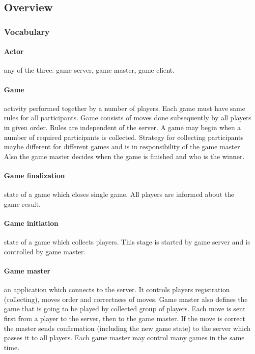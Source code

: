 \documentclass{article}
\begin{document}
\pagebreak[4]


\subsection{Overview}
\subsubsection{Vocabulary}

\paragraph{Actor}
any of the three: game server, game master, game client.

\paragraph{Game}
activity performed together by a number of players. Each game must have same rules for all participants. 
Game consists of moves done subsequently by all players in given order. 
Rules are independent of the server. A game may begin when a number of required participants is collected. 
Strategy for collecting participants maybe different for different games and is in responsibility 
of the game master. Also the game master decides when the game is finished and who is the winner.

\paragraph{Game finalization}state of a game which closes single game. 
All players are informed about the game result.

\paragraph{Game initiation} state of a game which collects players. This stage 
is started by game server and is controlled by game master.

\paragraph{Game master} an application which connects to the server. It controls players 
registration (collecting), moves order and correctness of moves. Game master 
also defines the game that is going to be played by collected group of players. Each move 
is sent first from a player to the server, then to the game master. If the move is correct 
the master sends confirmation (including the new game state) to the server 
which passes it to all players. Each game master may control many games in the same time.
\end{document}
